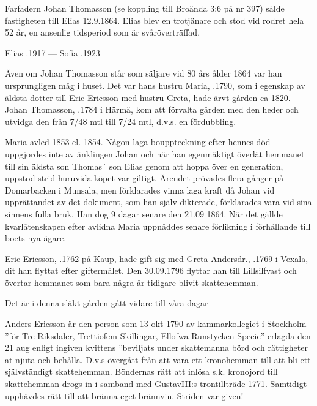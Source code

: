 Farfadern Johan Thomasson (se koppling till Broända 3:6 på nr 397) sålde fastigheten till Elias 12.9.1864. Elias blev en trotjänare och stod vid rodret hela 52 år, en ansenlig tidsperiod som är svåröverträffad.

Elias .1917 --- Sofia .1923


%
Även om Johan Thomasson står som säljare vid 80 års ålder 1864 var han ursprungligen måg i huset. Det var hans hustru Maria, .1790, som i egenskap av äldsta dotter till Eric Ericsson med hustru Greta, hade ärvt gården ca 1820. Johan Thomasson, .1784 i Härmä, kom att förvalta gården med den heder och utvidga den från 7/48 mtl till 7/24 mtl, d.v.s. en fördubbling.

Maria avled 1853 el. 1854. Någon laga bouppteckning efter hennes död uppgjordes inte av änklingen Johan och när han egenmäktigt överlät hemmanet till sin äldsta son Thomas´ son Elias genom att hoppa över en generation, uppstod strid huruvida köpet var giltigt. Ärendet prövades flera gånger på Domarbacken i Munsala, men förklarades vinna laga kraft då Johan vid upprättandet av det dokument, som han själv dikterade, förklarades vara vid sina sinnens fulla bruk. Han dog 9 dagar senare den 21.09 1864. När det gällde kvarlåtenskapen efter avlidna Maria uppnåddes senare förlikning i förhållande till boets nya ägare.


%
Eric Ericsson, .1762 på Kaup, hade gift sig med Greta Andersdr., .1769 i Vexala, dit han flyttat efter giftermålet. Den 30.09.1796 flyttar han till Lillsilfvast och övertar hemmanet som bara några år tidigare blivit skattehemman.
\begin{jhchildren}
  \item {}
  \item {}
  \item {}
\end{jhchildren}
Det är i denna släkt gården gått vidare till våra dagar


%
Anders Ericsson är den person som 13 okt 1790 av kammarkollegiet i Stockholm ”för Tre Riksdaler, Trettiofem Skillingar, Ellofwa Runstycken Specie” erlagda den 21 aug enligt ingiven kvittens ”beviljats under skattemanna  börd och rättigheter at njuta och behålla. D.v.s övergått från att vara ett kronohemman till att bli ett självständigt skattehemman. Böndernas rätt att inlösa s.k. kronojord till skattehemman drogs in i samband med GustavIII:s trontillträde 1771. Samtidigt upphävdes rätt till att bränna eget brännvin. Striden var given!


